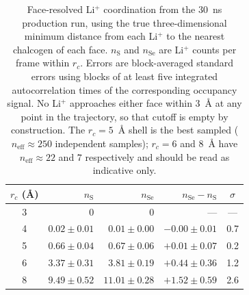\begin{table}[htbp]
\caption{Face-resolved Li$^+$ coordination from the 30~ns production run,
using the true three-dimensional minimum distance from each Li$^+$ to the
nearest chalcogen of each face. $n_{\mathrm{S}}$ and $n_{\mathrm{Se}}$ are
Li$^+$ counts per frame within $r_c$. Errors are block-averaged standard
errors using blocks of at least five integrated autocorrelation times of
the corresponding occupancy signal. No Li$^+$ approaches either face
within 3~\AA{} at any point in the trajectory, so that cutoff is empty by
construction. The $r_c = 5$~\AA{} shell is the best sampled
($n_{\mathrm{eff}} \approx 250$ independent samples); $r_c = 6$ and
8~\AA{} have $n_{\mathrm{eff}} \approx 22$ and $7$ respectively and
should be read as indicative only.}
\label{tab:contacts}
\centering
\begin{tabular}{crrrc}
\hline
$r_c$ (\AA) & $n_{\mathrm{S}}$ & $n_{\mathrm{Se}}$ & $n_{\mathrm{Se}}-n_{\mathrm{S}}$ & $\sigma$ \\
\hline
3 & 0 & 0 & --- & --- \\
4 & $0.02 \pm 0.01$ & $0.01 \pm 0.00$ & $-0.00 \pm 0.01$ & 0.7 \\
5 & $0.66 \pm 0.04$ & $0.67 \pm 0.06$ & $+0.01 \pm 0.07$ & 0.2 \\
6 & $3.37 \pm 0.31$ & $3.81 \pm 0.19$ & $+0.44 \pm 0.36$ & 1.2 \\
8 & $9.49 \pm 0.52$ & $11.01 \pm 0.28$ & $+1.52 \pm 0.59$ & 2.6 \\
\hline
\end{tabular}
\end{table}

